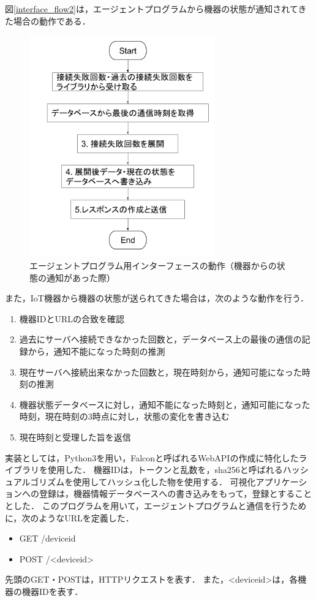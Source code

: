 図\ref{interface_flow2}は，エージェントプログラムから機器の状態が通知されてきた場合の動作である．
\begin{figure}[htbp]
\includegraphics[width=8cm]{images/interface_flow2.png}
\caption{エージェントプログラム用インターフェースの動作（機器からの状態の通知があった際）}
\label{fig:interface_flow2}
\end{figure}

また，IoT機器から機器の状態が送られてきた場合は，次のような動作を行う．
\begin{enumerate}
\item 機器IDとURLの合致を確認
\item 過去にサーバへ接続できなかった回数と，データベース上の最後の通信の記録から，通知不能になった時刻の推測
\item 現在サーバへ接続出来なかった回数と，現在時刻から，通知可能になった時刻の推測
\item 機器状態データベースに対し，通知不能になった時刻と，通知可能になった時刻，現在時刻の3時点に対し，状態の変化を書き込む
\item 現在時刻と受理した旨を返信
\end{enumerate}

実装としては，Python3を用い，Falconと呼ばれるWebAPIの作成に特化したライブラリを使用した．
機器IDは，トークンと乱数を，sha256と呼ばれるハッシュアルゴリズムを使用してハッシュ化した物を使用する．
可視化アプリケーションへの登録は，機器情報データベースへの書き込みをもって，登録とすることとした．
このプログラムを用いて，エージェントプログラムと通信を行うために，次のようなURLを定義した．
\begin{itemize}
	\item GET /deviceid
	\item POST /<deviceid>
\end{itemize}
先頭のGET・POSTは，HTTPリクエストを表す．
また，<deviceid>は，各機器の機器IDを表す．

